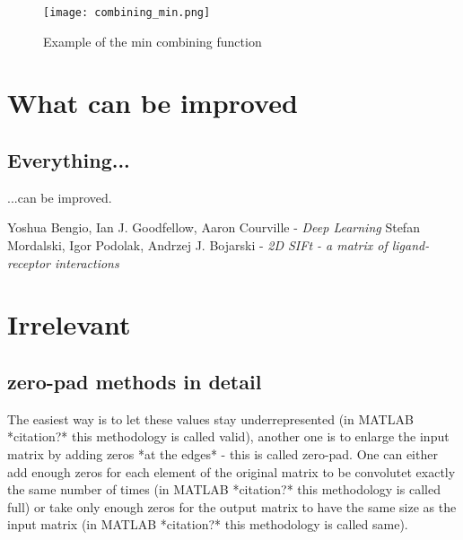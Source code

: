 \documentclass[a4paper,10pt]{report}
\begin{document}
      \begin{figure}[h!]
	  \centering
	  \texttt{[image: combining\_min.png]}
	  \caption{Example of the min combining function}
	  \label{fig:combining}	%
	\end{figure} 
	
      
     
	
  \chapter{What can be improved} %
    \section{Everything...}
      ...can be improved.\\

  \begin{thebibliography}{99}
      Yoshua Bengio, Ian J. Goodfellow, Aaron Courville - \emph{Deep Learning}
      Stefan Mordalski, Igor Podolak, Andrzej J. Bojarski - \emph{2D SIFt - a matrix of ligand-receptor interactions}
    
  \end{thebibliography}
  
  \chapter{Irrelevant} %
    \section{zero-pad methods in detail}
      The easiest way is to let these values stay underrepresented (in MATLAB *citation?* this methodology is called valid), another one is to enlarge the input matrix by adding zeros *at the edges* - this is called zero-pad. One can either add enough zeros for each element of the original matrix to be convolutet exactly the same number of times (in MATLAB *citation?* this methodology is called full) or take only enough zeros for the output matrix to have the same size as the input matrix (in MATLAB *citation?* this methodology is called same).\\
	  
\end{document}
